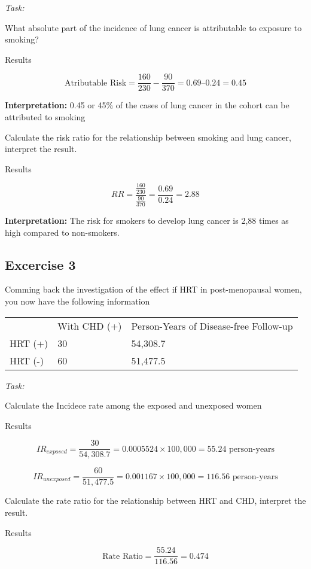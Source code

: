 \documentclass[
  letterpaper,
  paper=6in:9in,
  pagesize=pdftex,
  headinclude=on,
  footinclude=on,
  12pt]{scrbook}
\begin{document}
\emph{Task:}

What absolute part of the incidence of lung cancer is attributable to
exposure to smoking?

Results

\[
\text{Atributable Risk} = \frac{160}{230} - \frac{90}{370} =  0.69 – 0.24 = 0.45
\]

\textbf{Interpretation:} 0.45 or 45\% of the cases of lung cancer in the
cohort can be attributed to smoking

Calculate the risk ratio for the relationship between smoking and lung
cancer, interpret the result.

Results

\[
RR = \frac{\frac{160}{230}}{\frac{90}{370}} = \frac{0.69}{0.24} = 2.88
\]

\textbf{Interpretation:} The risk for smokers to develop lung cancer is
2,88 times as high compared to non-smokers.

\hypertarget{excercise-3}{%
\subsection{Excercise 3}\label{excercise-3}}

Comming back the investigation of the effect if HRT in post-menopausal
women, you now have the following information

\begin{longtable}[]{@{}lll@{}}
\toprule\noalign{}
\endhead
\bottomrule\noalign{}
\endlastfoot
& With CHD (+) & Person-Years of Disease-free Follow-up \\
HRT (+) & 30 & 54,308.7 \\
HRT (-) & 60 & 51,477.5 \\
\end{longtable}

\emph{Task:}

Calculate the Incidece rate among the exposed and unexposed women

Results

\[
IR_{exposed}= \frac{30}{54,308.7} = 0.0005524 \times 100,000 =  55.24 \text{ person-years}
\]

\[
IR_{unexposed}= \frac{60}{51,477.5} = 0.001167 \times 100,000 = 116.56 \text{ person-years}
\]

Calculate the rate ratio for the relationship between HRT and CHD,
interpret the result.

Results

\[
\text{Rate Ratio}= \frac{55.24}{116.56}  = 0.474
\]
\end{document}

